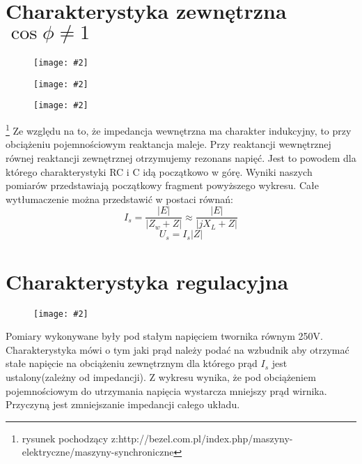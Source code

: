 \documentclass[12pt]{article}
\newcommand{\obrazek}[2]
{
	\begin{figure}[H]
	\centering
	\texttt{[image: \#2]}
	\end{figure}
}
\begin{document}
\section{Charakterystyka zewnętrzna $\cos\phi\neq1$}
	\obrazek{5}{tabele/cosfinie1}
	\obrazek{12}{wykresy/cosfinie1}
	\obrazek{12}{wykresy/wytlumaczenie}\footnote{rysunek pochodzący z:\newline http://bezel.com.pl/index.php/maszyny-elektryczne/maszyny-synchroniczne}
	Ze względu na to, że impedancja wewnętrzna ma charakter indukcyjny, to przy obciążeniu pojemnościowym reaktancja maleje. Przy reaktancji wewnętrznej równej reaktancji zewnętrznej otrzymujemy rezonans napięć. Jest to powodem dla którego charakterystyki RC i C idą początkowo w górę. 
	Wyniki naszych pomiarów przedstawiają początkowy fragment powyższego wykresu.
	Całe wytłumaczenie można przedstawić w postaci równań:
	\begin{equation}
	I_s=\frac{|E|}{|Z_w+Z|}\approx \frac{|E|}{|jX_L+Z|}
	\end{equation}
	\begin{equation}
	U_s=I_s|Z|
	\end{equation}


\section{Charakterystyka regulacyjna}
	\obrazek{12}{wykresy/regula}
Pomiary wykonywane były pod stałym napięciem twornika równym 250V. Charakterystyka mówi o tym jaki prąd należy podać na wzbudnik aby otrzymać stałe napięcie na obciążeniu zewnętrznym dla którego prąd $I_s$ jest ustalony(zależny od impedancji). 
Z wykresu wynika, że pod obciążeniem pojemnościowym do utrzymania napięcia wystarcza mniejszy prąd wirnika. Przyczyną jest zmniejszanie impedancji całego układu.
\end{document}
